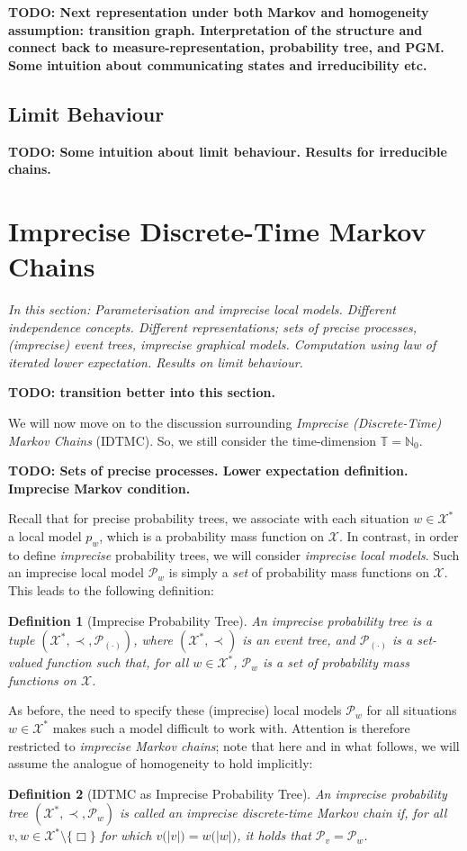 \documentclass[11pt]{book}
\newtheorem{definition}{Definition}
\newcommand{\nats}{\mathbb{N}}
\newcommand{\natswith}{\nats_{0}}
\newcommand{\states}{\mathcal{X}}
\newcommand{\timedim}{\mathbb{T}}
\begin{document}
{\bf TODO: Next representation under both Markov and homogeneity assumption: transition graph. Interpretation of the structure and connect back to measure-representation, probability tree, and PGM. Some intuition about communicating states and irreducibility etc. }

\subsection{Limit Behaviour}

{\bf TODO: Some intuition about limit behaviour. Results for irreducible chains. }

\section{Imprecise Discrete-Time Markov Chains}

\emph{In this section: Parameterisation and imprecise local models. Different independence concepts. Different representations; sets of precise processes, (imprecise) event trees, imprecise graphical models. Computation using law of iterated lower expectation. Results on limit behaviour.}

{\bf TODO: transition better into this section. }

We will now move on to the discussion surrounding \emph{Imprecise (Discrete-Time) Markov Chains} (IDTMC). So, we still consider the time-dimension $\timedim=\natswith$. 

{\bf TODO: Sets of precise processes. Lower expectation definition. Imprecise Markov condition.}


Recall that for precise probability trees, we associate with each situation $w\in\states^*$ a local model $p_w$, which is a probability mass function on $\states$. In contrast, in order to define \emph{imprecise} probability trees, we will consider \emph{imprecise local models}. Such an imprecise local model $\mathcal{P}_w$ is simply a \emph{set} of probability mass functions on $\states$. This leads to the following definition:
\begin{definition}[Imprecise Probability Tree]
An imprecise probability tree is a tuple $(\states^*,\prec,\mathcal{P}_{(\cdot)})$, where $(\states^*,\prec)$ is an event tree, and $\mathcal{P}_{(\cdot)}$ is a set-valued function such that, for all $w\in\states^*$, $\mathcal{P}_w$ is a set of probability mass functions on $\states$.
\end{definition}
As before, the need to specify these (imprecise) local models $\mathcal{P}_w$ for all situations $w\in\states^*$ makes such a model difficult to work with. Attention is therefore restricted to \emph{imprecise Markov chains}; note that here and in what follows, we will assume the analogue of homogeneity to hold implicitly:
\begin{definition}[IDTMC as Imprecise Probability Tree]An imprecise probability tree $(\states^*,\prec,\mathcal{P}_w)$ is called an imprecise discrete-time Markov chain if, for all $v,w\in\states^*\setminus\{\Box\}$ for which $v\bigl(\lvert v\rvert\bigr)=w\bigl(\lvert w\rvert\bigr)$, it holds that $\mathcal{P}_v=\mathcal{P}_w$.
\end{definition}
\end{document}

